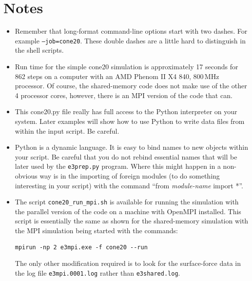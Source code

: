 \section{Notes}
\begin{itemize}
\item Remember that long-format command-line options start with two dashes.
      For example \texttt{--job=cone20}.
      These double dashes are a little hard to distinguish in the shell
      scripts.

\item Run time for the simple cone20 simulation 
      is approximately 17 seconds for 862 steps on a computer with 
      an AMD Phenom II X4 840, 800\,MHz processor.
      Of course, the shared-memory code does not make use of the other 4 processor cores,
      however, there is an MPI version of the code that can.

\item This cone20.py file really has full access to the Python interpreter
      on your system.  Later examples will show how to use Python to write
      data files from within the input script.  Be careful.

\item Python is a dynamic language.
      It is easy to bind names to new objects within your script.
      Be careful that you do not rebind essential names that will be
      later used by the \texttt{e3prep.py} program.
      Where this might happen in a non-obvious way is in the importing
      of foreign modules (to do something interesting in your script)
      with the command ``from \textit{module-name} import *''.

\item The script \texttt{cone20\_run\_mpi.sh} is available for running the simulation
  with the parallel version of the code on a machine with OpenMPI installed.
  This script is essentially the same as shown for the shared-memory simulation
  with the MPI simulation being started with the commands:
\begin{verbatim}
mpirun -np 2 e3mpi.exe -f cone20 --run
\end{verbatim}
  The only other modification required is to look for the surface-force data in the
  log file \texttt{e3mpi.0001.log} rather than \texttt{e3shared.log}.

\end{itemize}
